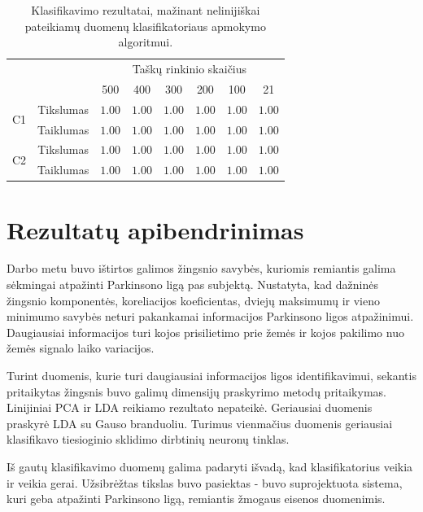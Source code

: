 \documentclass[]{vgtuef}
\begin{document}
\begin{table}
	\centering
	\caption{Klasifikavimo rezultatai, mažinant nelinijiškai pateikiamų duomenų klasifikatoriaus apmokymo algoritmui.}
	\label{table:second_phase_not_linear_experiment}
	\begin{tabular}{|c|c|c|c|c|c|c|c|} \hline
			& & \multicolumn{6}{c|}{Taškų rinkinio skaičius} \\ \cline{3-8}
						&	& 500 	& 400	& 300 	& 200 & 100 	& 21 	\\ \hline
		\multirow{2}{*}{C1}
		& Tikslumas	& $1.00$ & $1.00$	& $1.00$ & $1.00$ & $1.00$ & $1.00$ \\ \cline{2-8}
		& Taiklumas  &	$1.00$ & $1.00$	& $1.00$ & $1.00$ & $1.00$ & $1.00$ \\ \hline
		\multirow{2}{*}{C2}
		& Tikslumas	& $1.00$ & $1.00$	& $1.00$ & $1.00$ & $1.00$ & $1.00$ \\ \cline{2-8}
		& Taiklumas  &	$1.00$ & $1.00$	& $1.00$ & $1.00$ & $1.00$ & $1.00$ \\ \hline
	\end{tabular}
\end{table}




\section{Rezultatų apibendrinimas}


Darbo metu buvo ištirtos galimos žingsnio savybės, kuriomis remiantis galima sėkmingai atpažinti Parkinsono ligą pas subjektą. Nustatyta, kad dažninės žingsnio komponentės, koreliacijos koeficientas, dviejų maksimumų ir vieno minimumo savybės neturi pakankamai informacijos Parkinsono ligos atpažinimui. Daugiausiai informacijos turi kojos prisilietimo prie žemės ir kojos pakilimo nuo žemės signalo laiko variacijos.

Turint duomenis, kurie turi daugiausiai informacijos ligos identifikavimui, sekantis pritaikytas žingsnis buvo galimų dimensijų praskyrimo metodų pritaikymas. Linijiniai PCA ir LDA reikiamo rezultato nepateikė. Geriausiai duomenis praskyrė LDA su Gauso branduoliu. Turimus vienmačius duomenis geriausiai klasifikavo tiesioginio sklidimo dirbtinių neuronų tinklas. 

Iš gautų klasifikavimo duomenų galima padaryti išvadą, kad klasifikatorius veikia ir veikia gerai. Užsibrėžtas tikslas buvo pasiektas - buvo suprojektuota sistema, kuri geba atpažinti Parkinsono ligą, remiantis žmogaus eisenos duomenimis.







\end{document}
